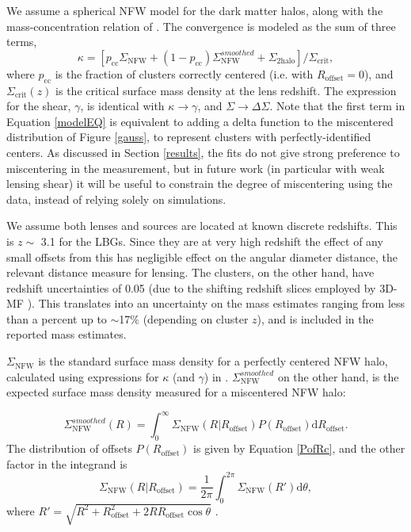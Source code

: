 We assume a spherical \acf{NFW} model \citep{nfw97} for the dark matter halos, along with the mass-concentration relation of \citet{Prada12}. The convergence is modeled as the sum of three terms,
\begin{equation}
\kappa = \left[p_{\mathrm{cc}}\Sigma_{\mathrm{NFW}} +(1-p_{\mathrm{cc}})\Sigma_{\mathrm{NFW}}^{smoothed} + \Sigma_{\mathrm{2halo}} \right]/\Sigma_{\mathrm{crit}},
\label{modelEQ}
\end{equation}
where $p_{\mathrm{cc}}$ is the fraction of clusters correctly centered (i.e. with $R_{\mathrm{offset}}=0$), and $\Sigma_{\mathrm{crit}}(z)$ is the critical surface mass density at the lens redshift. The expression for the shear, $\gamma$, is identical with $\kappa \rightarrow \gamma$, and $\Sigma \rightarrow \Delta\Sigma$. Note that the first term in Equation \ref{modelEQ} is equivalent to adding a delta function to the miscentered distribution of Figure \ref{gauss}, to represent clusters with perfectly-identified centers. As discussed in Section \ref{results}, the fits do not give strong preference to miscentering in the measurement, but in future work (in particular with weak lensing shear) it will be useful to constrain the degree of miscentering using the data, instead of relying solely on simulations.

We assume both lenses and sources are located at known discrete redshifts. This is $z \sim$ 3.1 for the \ac{LBG}s. Since they are at very high redshift the effect of any small offsets from this has negligible effect on the angular diameter distance, the relevant distance measure for lensing. The clusters, on the other hand, have redshift uncertainties of 0.05 (due to the shifting redshift slices employed by \ac{3D-MF} \citep{Milkeraitis10}). This translates into an uncertainty on the mass estimates ranging from less than a percent up to $\sim$17\% (depending on cluster $z$), and is included in the reported mass estimates.

$\Sigma_{\mathrm{NFW}}$ is the standard surface mass density for a perfectly centered \ac{NFW} halo, calculated using expressions for $\kappa$ (and $\gamma$) in \citet{Wright00}. $\Sigma_{\mathrm{NFW}}^{smoothed}$ on the other hand, is the expected surface mass density measured for a miscentered \ac{NFW} halo:

\begin{equation}
\Sigma_{\mathrm{NFW}}^{smoothed}(R)  = \int_0^\infty \Sigma_{\mathrm{NFW}}(R \vert R_{\mathrm{offset}}) P(R_{\mathrm{offset}}) \mathrm{d}R_{\mathrm{offset}}.
\end{equation}
The distribution of offsets $P(R_{\mathrm{offset}})$ is given by Equation \ref{PofRc}, and the other factor in the integrand is
\begin{equation}
\Sigma_{\mathrm{NFW}}(R \vert R_{\mathrm{offset}}) = \frac{1}{2\pi} \int_0^{2\pi} \Sigma_{\mathrm{NFW}}(R') \mathrm{d}\theta,
\end{equation}
where $R' = \sqrt{R^2 + R_{\mathrm{offset}}^2 + 2RR_{\mathrm{offset}}\cos\theta}$ \citep{Yang06}.

